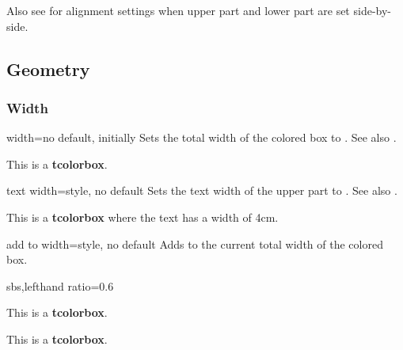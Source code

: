 Also see  for alignment settings when
upper part and lower part are set side-by-side.

\clearpage
\subsection{Geometry}
\subsubsection{Width}

\begin{docTcbKey}{width}{=}{no default, initially }
  Sets the total width of the colored box to .
  See also .
\begin{dispExample}

\begin{tcolorbox}[width=\linewidth/2]
This is a \textbf{tcolorbox}.
\end{tcolorbox}
\end{dispExample}
\end{docTcbKey}


\begin{docTcbKey}[][doc new=2014-10-31]{text width}{=}{style, no default}
  Sets the text width of the upper part to .
  See also .
\begin{dispExample}

\begin{tcolorbox}[text width=4cm]
This is a \textbf{tcolorbox} where the text has a width of 4cm.
\end{tcolorbox}
\end{dispExample}
\end{docTcbKey}

\begin{docTcbKey}[][doc new=2014-11-07]{add to width}{=}{style, no default}
  Adds  to the current total width of the colored box.
\begin{dispExample*}{sbs,lefthand ratio=0.6}

\begin{tcolorbox}
This is a \textbf{tcolorbox}.
\end{tcolorbox}

\begin{tcolorbox}[add to width=1cm]
This is a \textbf{tcolorbox}.
\end{tcolorbox}
\end{dispExample*}
\end{docTcbKey}


